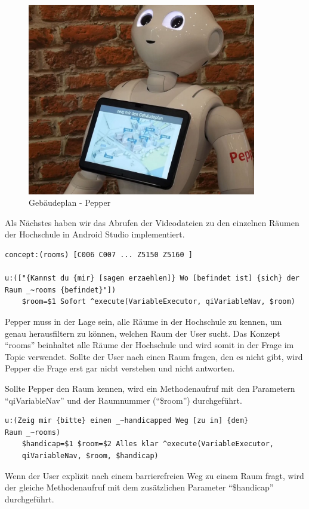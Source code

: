 \begin{figure}[H]
    \centering
    \includegraphics[width=10cm]{Figures/AppChapter/rx3.JPG}
    \caption{Gebäudeplan - Pepper}
    \label{fig:gplan}
    \centering
\end{figure}

Als Nächstes haben wir das Abrufen der Videodateien zu den einzelnen Räumen der Hochschule in Android 
Studio implementiert.

\begin{lstlisting}
concept:(rooms) [C006 C007 ... Z5150 Z5160 ]

u:(["{Kannst du {mir} [sagen erzaehlen]} Wo [befindet ist] {sich} der 
Raum _~rooms {befindet}"])
    $room=$1 Sofort ^execute(VariableExecutor, qiVariableNav, $room)
\end{lstlisting}

Pepper muss in der Lage sein, alle Räume in der Hochschule zu kennen, um genau herausfiltern zu können, welchen Raum der User sucht.
Das Konzept ``rooms'' beinhaltet alle Räume der Hochschule und wird somit in der Frage im Topic verwendet. Sollte der User 
nach einen Raum fragen, den es nicht gibt, wird Pepper die Frage erst gar nicht verstehen und nicht antworten. 

Sollte Pepper den Raum kennen, wird ein Methodenaufruf mit den Parametern ``qiVariableNav'' und der Raumnummer 
(``\$room'') durchgeführt.

\begin{lstlisting}
u:(Zeig mir {bitte} einen _~handicapped Weg [zu in] {dem} 
Raum _~rooms)
    $handicap=$1 $room=$2 Alles klar ^execute(VariableExecutor, 
    qiVariableNav, $room, $handicap)
\end{lstlisting}

Wenn der User explizit nach einem barrierefreien Weg zu einem Raum fragt, wird der gleiche Methodenaufruf mit dem zusätzlichen 
Parameter ``\$handicap'' durchgeführt.

